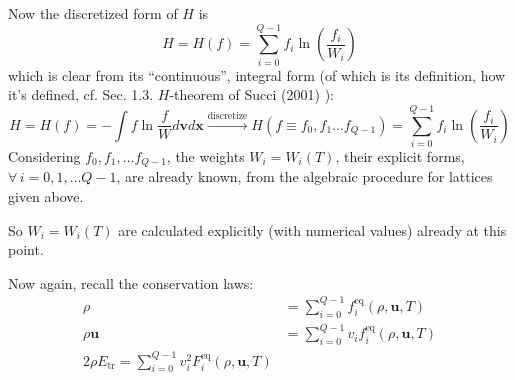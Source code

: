 \documentclass[twoside,landscape,10pt]{amsart}
\theoremstyle{plain}
\theoremstyle{definition}
\theoremstyle{remark}
\theoremstyle{remark}
\begin{document}
\begin{multicols*}{2}
Now the discretized form of $H$ is
\begin{equation}
  H=H(f) =\sum_{i=0}^{Q-1} f_i \ln{ \left( \frac{f_i}{W_i} \right)}
  \end{equation}
which is clear from its ``continuous'', integral form (of which is its definition, how it's defined, cf. Sec. 1.3. $H$-theorem of Succi (2001) \cite{Succ2001}):
\begin{equation}
  H=H(f) = -\int f \ln{ \frac{f}{W} } d\mathbf{v}d\mathbf{x} \xrightarrow{ \text{discretize} } H(f\equiv f_0,f_1\dots f_{Q-1}) =\sum_{i=0}^{Q-1} f_i \ln{ \left( \frac{f_i}{W_i} \right)}
  \end{equation}
Considering $f_0,f_1,\dots f_{Q-1}$, the weights $W_i = W_i(T)$, their explicit forms, $\forall \, i = 0,1,\dots Q-1$, are already known, from the algebraic procedure for lattices given above.

So $W_i=W_i(T)$ are calculated explicitly (with numerical values) already at this point.

Now again, recall the conservation laws:
\begin{equation}
\begin{aligned}
  \rho & = \sum_{i=0}^{Q-1} f_i^{\text{eq}}(\rho, \mathbf{u},T) \\ 
  \rho \mathbf{u} & = \sum_{i=0}^{Q-1} v_if_i^{\text{eq}}(\rho,\mathbf{u},T) \\ 
  2\rho E_{\text{tr}} = \sum_{i=0}^{Q-1} v_i^2 F_i^{\text{eq}}(\rho, \mathbf{u},T)
    \end{aligned}
  \end{equation}




\end{multicols*}
\end{document}
